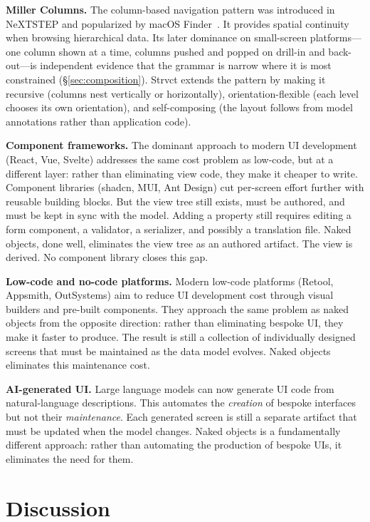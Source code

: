 \documentclass[sigplan,review,anonymous,10pt]{acmart}
\begin{document}
\textbf{Miller Columns.} The column-based navigation pattern was introduced in NeXTSTEP and popularized by macOS Finder~\cite{millercolumns}. It provides spatial continuity when browsing hierarchical data. Its later dominance on small-screen platforms---one column shown at a time, columns pushed and popped on drill-in and back-out---is independent evidence that the grammar is narrow where it is most constrained (\S\ref{sec:composition}). Strvct extends the pattern by making it recursive (columns nest vertically or horizontally), orientation-flexible (each level chooses its own orientation), and self-composing (the layout follows from model annotations rather than application code).

\textbf{Component frameworks.} The dominant approach to modern UI development (React, Vue, Svelte) addresses the same cost problem as low-code, but at a different layer: rather than eliminating view code, they make it cheaper to write. Component libraries (shadcn, MUI, Ant Design) cut per-screen effort further with reusable building blocks. But the view tree still exists, must be authored, and must be kept in sync with the model. Adding a property still requires editing a form component, a validator, a serializer, and possibly a translation file. Naked objects, done well, eliminates the view tree as an authored artifact. The view is derived. No component library closes this gap.

\textbf{Low-code and no-code platforms.} Modern low-code platforms (Retool, Appsmith, OutSystems) aim to reduce UI development cost through visual builders and pre-built components. They approach the same problem as naked objects from the opposite direction: rather than eliminating bespoke UI, they make it faster to produce. The result is still a collection of individually designed screens that must be maintained as the data model evolves. Naked objects eliminates this maintenance cost.

\textbf{AI-generated UI.} Large language models can now generate UI code from natural-language descriptions. This automates the \emph{creation} of bespoke interfaces but not their \emph{maintenance}. Each generated screen is still a separate artifact that must be updated when the model changes. Naked objects is a fundamentally different approach: rather than automating the production of bespoke UIs, it eliminates the need for them.

\section{Discussion}
\label{sec:discussion}
\end{document}
